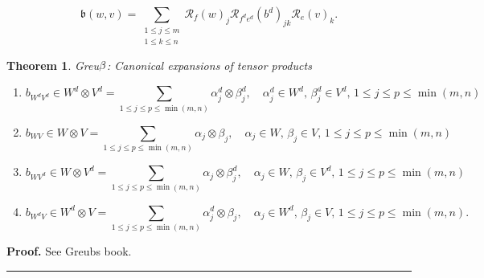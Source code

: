 \documentclass[aps,preprint]{revtex4}%
\newtheorem{theorem}{Theorem}
\newenvironment{proof}[1][Proof]{\noindent\textbf{#1.} }{\ \rule{0.5em}{0.5em}}
\begin{document}
\begin{equation}
\mathfrak{b}\left(  w,v\right)  =\sum_{\substack{1\leq j\leq m\\1\leq k\leq
n}}\mathcal{R}_{f}\left(  w\right)  _{j}\mathcal{R}_{f^{d}e^{d}}\left(
b^{d}\right)  _{jk}\mathcal{R}_{e}\left(  v\right)  _{k}.
\end{equation}


\begin{theorem}
\label{GreuB} Greu${\large \beta}${\large : }Canonical expansions of tensor products

\begin{enumerate}
\item
\begin{equation}
b_{W^{d}V^{d}}\in W^{d}\otimes V^{d}=\sum_{1\leq j\leq p\leq\min\left(
m,n\right)  }\alpha_{j}^{d}\otimes\beta_{j}^{d},\quad\alpha_{j}^{d}\in
W^{d},\,\beta_{j}^{d}\in V^{d},\,1\leq j\leq p\leq\min\left(  m,n\right)
\end{equation}


\item
\begin{equation}
b_{WV}\in W\otimes V=\sum_{1\leq j\leq p\leq\min\left(  m,n\right)  }%
\alpha_{j}\otimes\beta_{j},\quad\alpha_{j}\in W,\,\beta_{j}\in V,\,1\leq j\leq
p\leq\min\left(  m,n\right)
\end{equation}


\item
\begin{equation}
b_{WV^{d}}\in W\otimes V^{d}=\sum_{1\leq j\leq p\leq\min\left(  m,n\right)
}\alpha_{j}\otimes\beta_{j}^{d},\quad\alpha_{j}\in W,\,\beta_{j}\in
V^{d},\,1\leq j\leq p\leq\min\left(  m,n\right)
\end{equation}


\item
\begin{equation}
b_{W^{d}V}\in W^{d}\otimes V=\sum_{1\leq j\leq p\leq\min\left(  m,n\right)
}\alpha_{j}^{d}\otimes\beta_{j},\quad\alpha_{j}\in W^{d},\,\beta_{j}\in
V,\,1\leq j\leq p\leq\min\left(  m,n\right)  .
\end{equation}

\end{enumerate}
\end{theorem}

\begin{proof}
See Greubs book.
\end{proof}
\end{document}
